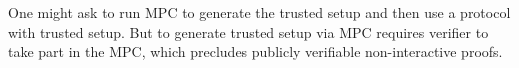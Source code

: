 One might ask to run MPC to generate the trusted setup and then use a protocol with trusted setup. But to generate trusted setup via MPC requires verifier to take part in the MPC, which precludes publicly verifiable non-interactive proofs.

